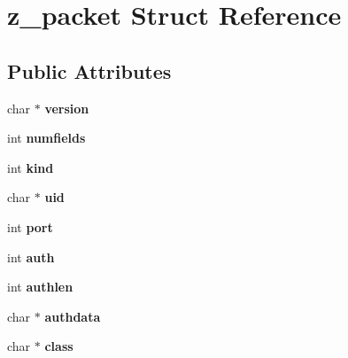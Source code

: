 \hypertarget{structz__packet}{
\section{z\_\-packet Struct Reference}
\label{structz__packet}
}
\subsection*{Public Attributes}
\begin{DoxyCompactItemize}
\item 
\hypertarget{structz__packet_a9d829db4ed908a75136e567226f36874}{
char $\ast$ {\bfseries version}}
\label{structz__packet_a9d829db4ed908a75136e567226f36874}

\item 
\hypertarget{structz__packet_ae8ff0ee7ac2cdec90666866abde561c7}{
int {\bfseries numfields}}
\label{structz__packet_ae8ff0ee7ac2cdec90666866abde561c7}

\item 
\hypertarget{structz__packet_a6ae9a9476955e7d9d8a74f60e4fbf158}{
int {\bfseries kind}}
\label{structz__packet_a6ae9a9476955e7d9d8a74f60e4fbf158}

\item 
\hypertarget{structz__packet_a2530930ff3bc2bd1008870134a76a4df}{
char $\ast$ {\bfseries uid}}
\label{structz__packet_a2530930ff3bc2bd1008870134a76a4df}

\item 
\hypertarget{structz__packet_acca1aaeb9fdc54ada22ab47db7940f79}{
int {\bfseries port}}
\label{structz__packet_acca1aaeb9fdc54ada22ab47db7940f79}

\item 
\hypertarget{structz__packet_ae4c10654a44f47861a87183c661e45f7}{
int {\bfseries auth}}
\label{structz__packet_ae4c10654a44f47861a87183c661e45f7}

\item 
\hypertarget{structz__packet_acc9b788d14eecbd2924213c8a275c4b8}{
int {\bfseries authlen}}
\label{structz__packet_acc9b788d14eecbd2924213c8a275c4b8}

\item 
\hypertarget{structz__packet_a47e505518cca2c550e12c8a77897c73a}{
char $\ast$ {\bfseries authdata}}
\label{structz__packet_a47e505518cca2c550e12c8a77897c73a}

\item 
\hypertarget{structz__packet_a0f0d5acb22e10427070521554c7fd3a8}{
char $\ast$ {\bfseries class}}
\label{structz__packet_a0f0d5acb22e10427070521554c7fd3a8}


\end{DoxyCompactItemize}
